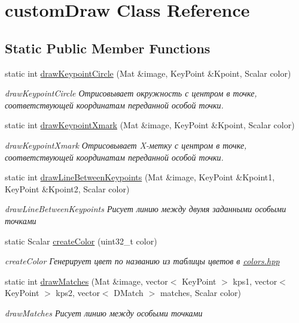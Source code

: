 \hypertarget{classcustom_draw}{}\section{custom\+Draw Class Reference}
\label{classcustom_draw}
\subsection*{Static Public Member Functions}
\begin{DoxyCompactItemize}
\item 
static int \hyperlink{classcustom_draw_aced241b508544a5dea840f97fe1f2e2c}{draw\+Keypoint\+Circle} (Mat \&image, Key\+Point \&Kpoint, Scalar color)
\begin{DoxyCompactList}\small\item\em draw\+Keypoint\+Circle Отрисовывает окружность с центром в точке, соответствующей координатам переданной особой точки. \end{DoxyCompactList}\item 
static int \hyperlink{classcustom_draw_ab2d07b0922ada8467a5eadf5c26fc7b7}{draw\+Keypoint\+Xmark} (Mat \&image, Key\+Point \&Kpoint, Scalar color)
\begin{DoxyCompactList}\small\item\em draw\+Keypoint\+Xmark Отрисовывает X-\/метку с центром в точке, соответствующей координатам переданной особой точки. \end{DoxyCompactList}\item 
static int \hyperlink{classcustom_draw_a5bcac7ca4e055881b17d36b9c70ead92}{draw\+Line\+Between\+Keypoints} (Mat \&image, Key\+Point \&Kpoint1, Key\+Point \&Kpoint2, Scalar color)
\begin{DoxyCompactList}\small\item\em draw\+Line\+Between\+Keypoints Рисует линию между двумя заданными особыми точками \end{DoxyCompactList}\item 
static Scalar \hyperlink{classcustom_draw_a9b316ec0c5b586ab78d734c121e584c5}{create\+Color} (uint32\+\_\+t color)
\begin{DoxyCompactList}\small\item\em create\+Color Генерирует цвет по названию из таблицы цветов в \hyperlink{colors_8hpp_source}{colors.\+hpp} \end{DoxyCompactList}\item 
static int \hyperlink{classcustom_draw_af350b300142db4bfe210b57a40e7a610}{draw\+Matches} (Mat \&image, vector$<$ Key\+Point $>$ kps1, vector$<$ Key\+Point $>$ kps2, vector$<$ D\+Match $>$ matches, Scalar color)
\begin{DoxyCompactList}\small\item\em draw\+Matches Рисует линию между особыми точками \end{DoxyCompactList}\end{DoxyCompactItemize}



